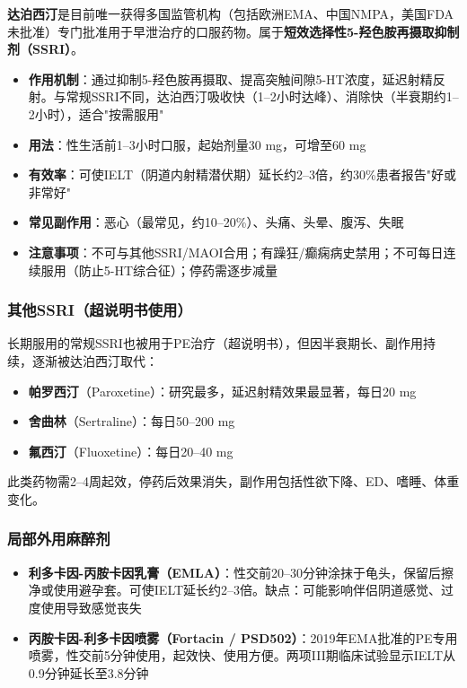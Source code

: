 \textbf{达泊西汀}是目前唯一获得多国监管机构（包括欧洲EMA、中国NMPA，美国FDA未批准）专门批准用于早泄治疗的口服药物。属于\textbf{短效选择性5-羟色胺再摄取抑制剂（SSRI）}。

\begin{itemize}[leftmargin=2cm]
	\item \textbf{作用机制}：通过抑制5-羟色胺再摄取、提高突触间隙5-HT浓度，延迟射精反射。与常规SSRI不同，达泊西汀吸收快（1--2小时达峰）、消除快（半衰期约1--2小时），适合"按需服用"
	\item \textbf{用法}：性生活前1--3小时口服，起始剂量30 mg，可增至60 mg
	\item \textbf{有效率}：可使IELT（阴道内射精潜伏期）延长约2--3倍，约30\%患者报告"好或非常好"
	\item \textbf{常见副作用}：恶心（最常见，约10--20\%）、头痛、头晕、腹泻、失眠
	\item \textbf{注意事项}：不可与其他SSRI/MAOI合用；有躁狂/癫痫病史禁用；不可每日连续服用（防止5-HT综合征）；停药需逐步减量
\end{itemize}

\subsubsection{其他SSRI（超说明书使用）}

长期服用的常规SSRI也被用于PE治疗（超说明书），但因半衰期长、副作用持续，逐渐被达泊西汀取代：
\begin{itemize}[leftmargin=2cm]
	\item \textbf{帕罗西汀}（Paroxetine）：研究最多，延迟射精效果最显著，每日20 mg
	\item \textbf{舍曲林}（Sertraline）：每日50--200 mg
	\item \textbf{氟西汀}（Fluoxetine）：每日20--40 mg
\end{itemize}
此类药物需2--4周起效，停药后效果消失，副作用包括性欲下降、ED、嗜睡、体重变化。

\subsubsection{局部外用麻醉剂}

\begin{itemize}[leftmargin=2cm]
	\item \textbf{利多卡因-丙胺卡因乳膏（EMLA）}：性交前20--30分钟涂抹于龟头，保留后擦净或使用避孕套。可使IELT延长约2--3倍。缺点：可能影响伴侣阴道感觉、过度使用导致感觉丧失
	\item \textbf{丙胺卡因-利多卡因喷雾（Fortacin / PSD502）}：2019年EMA批准的PE专用喷雾，性交前5分钟使用，起效快、使用方便。两项III期临床试验显示IELT从0.9分钟延长至3.8分钟
\end{itemize}

